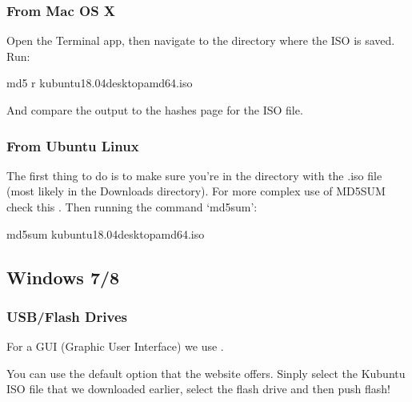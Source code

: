 \documentclass[letterpaper,10pt,english]{sphinxmanual}
\begin{document}
\subsubsection{From Mac OS X}
\label{\detokenize{docs/installation:from-mac-os-x}}
Open the Terminal app, then navigate to the directory where the ISO is saved.
Run:

%
\begin{sphinxVerbatim}[commandchars=\\\{\}]
md5 \PYGZhy{}r kubuntu\PYGZhy{}18.04\PYGZhy{}desktop\PYGZhy{}amd64.iso
\end{sphinxVerbatim}

And compare the output to the hashes page for the ISO file.


\subsubsection{From Ubuntu Linux}
\label{\detokenize{docs/installation:from-ubuntu-linux}}
The first thing to do is to make sure you’re in the directory with the .iso file (most likely in the Downloads directory). For more complex use of MD5SUM check this . Then running the command ‘md5sum’:

%
\begin{sphinxVerbatim}[commandchars=\\\{\}]
md5sum kubuntu\PYGZhy{}18.04\PYGZhy{}desktop\PYGZhy{}amd64.iso
\end{sphinxVerbatim}


\subsection{Windows 7/8}
\label{\detokenize{docs/installation:windows-7-8}}

\subsubsection{USB/Flash Drives}
\label{\detokenize{docs/installation:usb-flash-drives}}\label{\detokenize{docs/installation:usb-drives-link}}
For a GUI (Graphic User Interface) we use .

You can use the default option that the website offers. Sinply select the Kubuntu ISO file  that we downloaded earlier, select the flash drive and then push flash!

\end{document}
